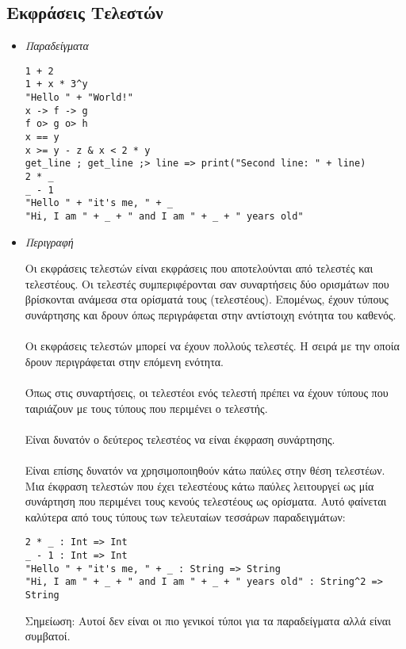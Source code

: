 \documentclass[diploma]{softlab-thesis}
\begin{document}
\newpage
\subsection{Εκφράσεις Τελεστών}

\begin{itemize}
\item \textit{Παραδείγματα}
\begin{verbatim}
1 + 2
1 + x * 3^y
"Hello " + "World!"
x -> f -> g
f o> g o> h
x == y
x >= y - z & x < 2 * y
get_line ; get_line ;> line => print("Second line: " + line)
2 * _
_ - 1
"Hello " + "it's me, " + _
"Hi, I am " + _ + " and I am " + _ + " years old"
\end{verbatim}

\item \textit{Περιγραφή}

Οι εκφράσεις τελεστών είναι εκφράσεις που αποτελούνται από τελεστές και
τελεστέους. Οι τελεστές συμπεριφέρονται σαν συναρτήσεις δύο ορισμάτων που
βρίσκονται ανάμεσα στα ορίσματά τους (τελεστέους). Επομένως, έχουν τύπους
συνάρτησης και δρουν όπως περιγράφεται στην αντίστοιχη ενότητα του
καθενός.
\\\\
Οι εκφράσεις τελεστών μπορεί να έχουν πολλούς τελεστές. H σειρά με την
οποία δρουν περιγράφεται στην επόμενη ενότητα.
\\\\
Όπως στις συναρτήσεις, οι τελεστέοι ενός τελεστή πρέπει να έχουν τύπους
που ταιριάζουν με τους τύπους που περιμένει ο τελεστής.
\\\\
Είναι δυνατόν ο δεύτερος τελεστέος να είναι έκφραση συνάρτησης.
\\\\
Είναι επίσης δυνατόν να χρησιμοποιηθούν κάτω παύλες στην θέση τελεστέων.
Μια έκφραση τελεστών που έχει τελεστέους κάτω παύλες λειτουργεί ως μία
συνάρτηση που περιμένει τους κενούς τελεστέους ως ορίσματα.
Αυτό φαίνεται καλύτερα από τους τύπους των τελευταίων τεσσάρων
παραδειγμάτων:

\begin{verbatim}
2 * _ : Int => Int
_ - 1 : Int => Int
"Hello " + "it's me, " + _ : String => String
"Hi, I am " + _ + " and I am " + _ + " years old" : String^2 => String
\end{verbatim}
Σημείωση: Αυτοί δεν είναι οι πιο γενικοί τύποι για τα παραδείγματα αλλά είναι
συμβατοί.

\end{itemize}
\end{document}
